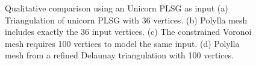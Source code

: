 \documentclass[lineno,pdflatex,sn-mathphys]{sn-jnl}%
\theoremstyle{thmstyleone}%
\theoremstyle{thmstyletwo}%
\theoremstyle{thmstylethree}%
\begin{document}
\begin{figure}[]
\centering     %
{}%
%
%

\caption{ Qualitative comparison using an Unicorn PLSG as input \cite{AlejandroNUA2019} (a) Triangulation of unicorn PLSG with 36 vertices. (b) Polylla mesh includes exactly the 36 input vertices. (c) The constrained Voronoi mesh requires 100 vertices to model the same input. (d) Polylla mesh from a refined  Delaunay triangulation with 100 vertices.}
\label{figs:univornPSLG} 
\end{figure}
\end{document}
